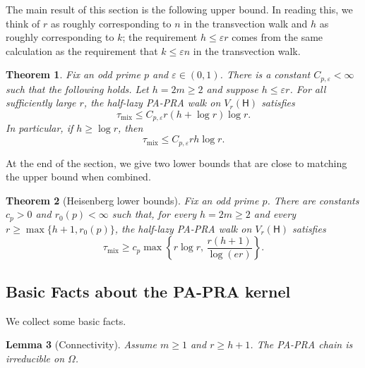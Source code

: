 \documentclass[11pt, reqno]{amsart}
\numberwithin{equation}{section}
\newtheorem{theorem}{Theorem}[section]
\newtheorem{lemma}[theorem]{Lemma}
\newcommand{\Heis}{\mathsf H}
\begin{document}
The main result of this section is the following upper bound. In reading this, we think of $r$ as roughly corresponding to $n$ in the transvection walk and $h$ as roughly corresponding to $k$; the requirement $h \leq \varepsilon r$ comes from the same calculation as the requirement that $k \leq \varepsilon n$ in the transvection walk.

\begin{theorem}\label{thm:heis-main}
Fix an odd prime \(p\) and \(\varepsilon\in(0,1)\).  There is a constant
\(C_{p,\varepsilon}<\infty\) such that the following holds.  Let
\(h=2m\ge2\) and suppose \(h\le\varepsilon r\).  For all sufficiently large
\(r\), the half-lazy PA-PRA walk on
\(V_r(\Heis)\) satisfies
\[
    \tau_{\mathrm{mix}}\le C_{p,\varepsilon} r(h+\log r)\log r.
\]
In particular, if \(h\ge\log r\), then
\[
    \tau_{\mathrm{mix}}\le C_{p,\varepsilon} rh\log r.
\]
\end{theorem}

At the end of the section, we give two lower bounds that are close to matching the upper bound when combined. 

\begin{theorem}[Heisenberg lower bounds]\label{thm:heis-lower}
Fix an odd prime \(p\).  There are constants \(c_p>0\) and \(r_0(p)<\infty\)
such that, for every \(h=2m\ge2\) and every \(r\ge\max\{h+1,r_0(p)\}\),
the half-lazy PA-PRA walk on \(V_r(\Heis)\) satisfies
\[
    \tau_{\mathrm{mix}}
    \ge c_p\max\left\{r\log r,\,\frac{r(h+1)}{\log(e r)}\right\}.
\]
\end{theorem}


\subsection{Basic Facts about the PA-PRA kernel}

We collect some basic facts.

\begin{lemma}[Connectivity]\label{lem:heis-connectivity}
Assume \(m\ge1\) and \(r\ge h+1\).  The PA-PRA
chain is irreducible on \(\Omega\).
\end{lemma}
\end{document}

